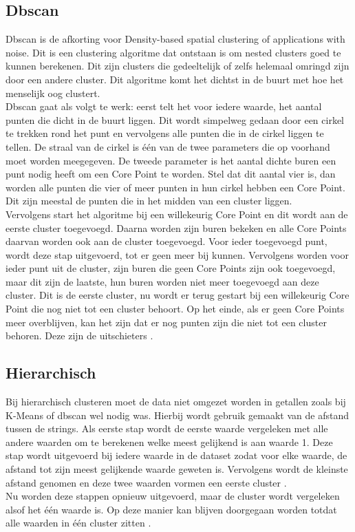 

\subsection{Dbscan}
Dbscan is de afkorting voor Density-based spatial clustering of applications with noise. Dit is een clustering algoritme dat ontstaan is om nested clusters goed te kunnen berekenen. Dit zijn clusters die gedeeltelijk of zelfs helemaal omringd zijn door een andere cluster. Dit algoritme komt het dichtst in de buurt met hoe het menselijk oog clustert.
\\\indent
Dbscan gaat als volgt te werk: eerst telt het voor iedere waarde, het aantal punten die dicht in de buurt liggen. Dit wordt simpelweg gedaan door een cirkel te trekken rond het punt en vervolgens alle punten die in de cirkel liggen te tellen. De straal van de cirkel is één van de twee parameters die op voorhand moet worden meegegeven. De tweede parameter is het aantal dichte buren een punt nodig heeft om een Core Point te worden. Stel dat dit aantal vier is, dan worden alle punten die vier of meer punten in hun cirkel hebben een Core Point. Dit zijn meestal de punten die in het midden van een cluster liggen.
\\\indent
Vervolgens start het algoritme bij een willekeurig Core Point en dit wordt aan de eerste cluster toegevoegd. Daarna worden zijn buren bekeken en alle Core Points daarvan worden ook aan de cluster toegevoegd. Voor ieder toegevoegd punt, wordt deze stap uitgevoerd, tot er geen meer bij kunnen. Vervolgens worden voor ieder punt uit de cluster, zijn buren die geen Core Points zijn ook toegevoegd, maar dit zijn de laatste, hun buren worden niet meer toegevoegd aan deze cluster. Dit is de eerste cluster, nu wordt er terug gestart bij een willekeurig Core Point die nog niet tot een cluster behoort. Op het einde, als er geen Core Points meer overblijven, kan het zijn dat er nog punten zijn die niet tot een cluster behoren. Deze zijn de uitschieters \autocite{Starmer2022}.

\subsection{Hierarchisch}
Bij hierarchisch clusteren moet de data niet omgezet worden in getallen zoals bij K-Means of dbscan wel nodig was. Hierbij wordt gebruik gemaakt van de afstand tussen de strings. Als eerste stap wordt de eerste waarde vergeleken met alle andere waarden om te berekenen welke meest gelijkend is aan waarde 1. Deze stap wordt uitgevoerd bij iedere waarde in de dataset zodat voor elke waarde, de afstand tot zijn meest gelijkende waarde geweten is. Vervolgens wordt de kleinste afstand genomen en deze twee waarden vormen een eerste cluster \autocite{Starmer2017}.
\\\indent
Nu worden deze stappen opnieuw uitgevoerd, maar de cluster wordt vergeleken alsof het één waarde is. Op deze manier kan blijven doorgegaan worden totdat alle waarden in één cluster zitten \autocite{Starmer2017}.



